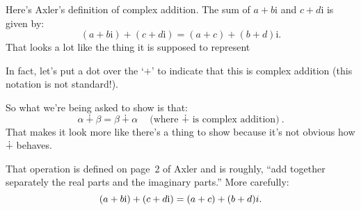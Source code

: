 \documentclass[10pt, a4paper, twocolumn]{article}
\newcommand{\ii}{\mathrm{i}}
\begin{document}
Here's Axler's definition of complex addition. The sum of $a+b\ii$ and $c+d\ii$ is given by:
\begin{equation*}
  (a+b\ii) + (c +d\ii) = (a+c) + (b+d)\ii.
\end{equation*}
That looks a lot like the thing it is supposed to represent



In fact, let's put a dot over the `$+$' to indicate that this is complex addition (this notation is not standard!).

So what we're being asked to show is that:
\begin{equation*}
  \alpha \dotplus \beta = \beta \dotplus \alpha \quad\text{(where $\dotplus$ is complex addition)}.
\end{equation*}
That makes it look more like there's a thing to show because it's not obvious how $\dotplus$ behaves.




That operation is defined on page~2 of Axler and is roughly, ``add together separately the real parts and the imaginary parts.'' More carefully:
\begin{equation*}
  (a + b\ii) + (c + d\ii) = (a+c) + (b+d)\\i.
\end{equation*}
\end{document}
